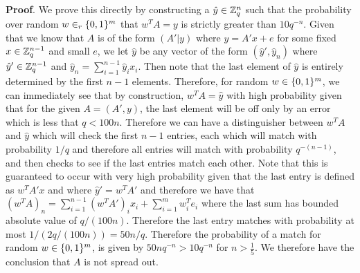 \documentclass{article}
\begin{document}
\begin{enumerate}[,start=5]
\begin{enumerate}[noitemsep,topsep=\mdcompacttopsep,label=\alph*.]
\begin{mdbmarginx}{1ex}{0pt}{1ex}{0pt}%
\noindent{}\textbf{Proof}.  We prove this directly by constructing a $\hat{y} \in \mathbb{Z}^n_q$ such that the probability over random
$w \in_r \{0,1\}^m$ that $w^T A = y$ is strictly greater than $10 q^{-n}$. Given that we know that 
$A$ is of the form $(A' | y)$ where $y = A'x + e$ for some fixed $x \in \mathbb{Z}_q^{n-1}$ and small
$e$, we let $\hat{y}$ be any vector of the form $(\hat{y}', \hat{y}_n)$ where $\hat{y}' \in\mathbb{Z}_q^{n-1}$
and $\hat{y}_n = \sum_{i=1}^{n-1} \hat{y}_i x_i$. Then note that the last element of $\hat{y}$ is
entirely determined by the first $n-1$ elements. Therefore, for random $w \in \{0,1\}^m$, we can
immediately see that by construction, $w^T A= \hat{y}$ with high probability given that for
the given $A = (A', y)$, the last element will be off only by an error which is less that
$q < 100 n$. Therefore we can have a distinguisher between $w^T A$  and $\hat{y}$ which will
check the first $n - 1$ entries, each which will match with probability $1/q$ and therefore all
entries will match with probability $q^{-(n-1)}$, and then checks to see if the last entries 
match each other. Note that this is guaranteed
to occur with very high probability given that the last entry is defined as $w^T A' x$ and where
$\hat{y}' = w^T A'$ and therefore we have that $(w^T A)_n = \sum_{i=1}^{n-1} (w^T A')_i x_i + \sum_{i=1}^{m} w^T_i e_i$
where the last sum has bounded absolute value of $q /(100 n)$. Therefore the last entry matches 
with probability at most $1 / (2q / (100 n)) = 50n/q$. Therefore the probability of a match
for random $w \in \{0,1\}^m$, is given by $50n q^{-n} > 10q^{-n}$ for $n > \frac{1}{5}$. We therefore
have the conclusion that $A$ is not spread out.%
\end{mdbmarginx}%


\end{enumerate}
\end{enumerate}
\end{document}
